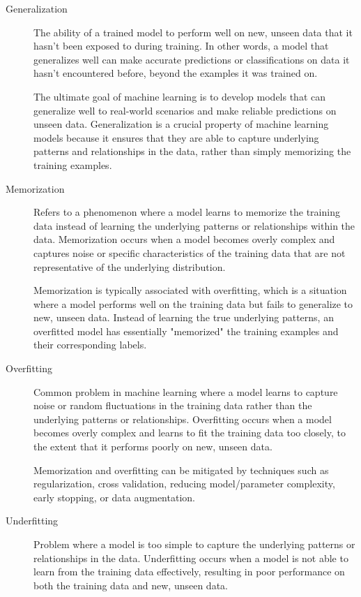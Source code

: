\documentclass[a4paper]{article}
\begin{document}
\begin{description}
\item[Generalization]
The ability of a trained model to perform well on new, unseen data that it hasn't been exposed to during training. In other words, a model that generalizes well can make accurate predictions or classifications on data it hasn't encountered before, beyond the examples it was trained on.

The ultimate goal of machine learning is to develop models that can generalize well to real-world scenarios and make reliable predictions on unseen data. Generalization is a crucial property of machine learning models because it ensures that they are able to capture underlying patterns and relationships in the data, rather than simply memorizing the training examples.

\item[Memorization]
Refers to a phenomenon where a model learns to memorize the training data instead of learning the underlying patterns or relationships within the data. Memorization occurs when a model becomes overly complex and captures noise or specific characteristics of the training data that are not representative of the underlying distribution.

Memorization is typically associated with overfitting, which is a situation where a model performs well on the training data but fails to generalize to new, unseen data. Instead of learning the true underlying patterns, an overfitted model has essentially "memorized" the training examples and their corresponding labels.

\item[Overfitting]
Common problem in machine learning where a model learns to capture noise or random fluctuations in the training data rather than the underlying patterns or relationships. Overfitting occurs when a model becomes overly complex and learns to fit the training data too closely, to the extent that it performs poorly on new, unseen data.

Memorization and overfitting can be mitigated by techniques such as regularization, cross validation, reducing model/parameter complexity, early stopping, or data augmentation.

\item[Underfitting]
Problem where a model is too simple to capture the underlying patterns or relationships in the data. Underfitting occurs when a model is not able to learn from the training data effectively, resulting in poor performance on both the training data and new, unseen data. 


\end{description}
\end{document}
